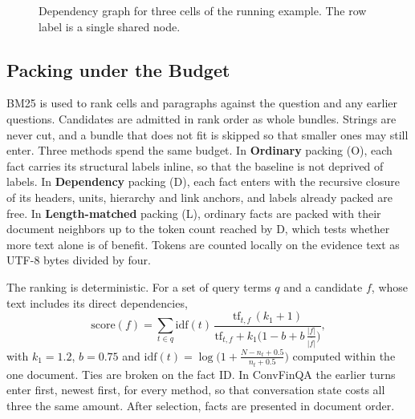\documentclass[11pt]{article}
\begin{document}
\begin{figure}[t]
\centering
{}
\caption{Dependency graph for three cells of the running example. The row label is a
single shared node.}
\label{fig:graph}
\end{figure}

\subsection{Packing under the Budget}
BM25 is used to rank cells and paragraphs against the question and any earlier
questions. Candidates are admitted in rank order as whole bundles. Strings are never
cut, and a bundle that does not fit is skipped so that smaller ones may still enter.
Three methods spend the same budget. In \textbf{Ordinary} packing (O), each fact carries
its structural labels inline, so that the baseline is not deprived of labels. In
\textbf{Dependency} packing (D), each fact enters with the recursive closure of its
headers, units, hierarchy and link anchors, and labels already packed are free. In
\textbf{Length-matched} packing (L), ordinary facts are packed with their document
neighbors up to the token count reached by D, which tests whether more text alone is
of benefit. Tokens are counted locally on the evidence text as UTF-8 bytes divided by
four.

The ranking is deterministic. For a set of query terms $q$ and a candidate $f$, whose
text includes its direct dependencies,
\begin{equation}
\mathrm{score}(f)=\sum_{t\in q}\mathrm{idf}(t)\,
\frac{\mathrm{tf}_{t,f}\,(k_1+1)}{\mathrm{tf}_{t,f}+k_1\bigl(1-b+b\,\frac{|f|}{\overline{|f|}}\bigr)},
\end{equation}
with $k_1=1.2$, $b=0.75$ and $\mathrm{idf}(t)=\log\bigl(1+\frac{N-n_t+0.5}{n_t+0.5}\bigr)$
computed within the one document. Ties are broken on the fact ID. In ConvFinQA the
earlier turns enter first, newest first, for every method, so that conversation state
costs all three the same amount. After selection, facts are presented in document order.
\end{document}
